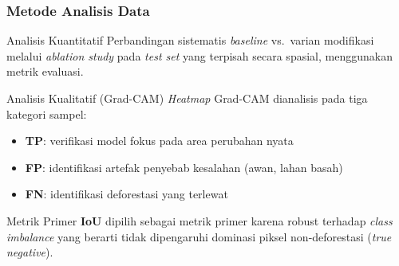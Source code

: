 \documentclass{beamer}
\begin{document}
	\begin{frame}
		\frametitle{Metode Analisis Data}
		
		\begin{block}{Analisis Kuantitatif}
			\small
			Perbandingan sistematis \textit{baseline} vs.\ varian modifikasi 
			melalui \textit{ablation study} pada \textit{test set} yang 
			terpisah secara spasial, menggunakan metrik evaluasi.
		\end{block}
		
		\begin{block}{Analisis Kualitatif (Grad-CAM)}
			\small
			\textit{Heatmap} Grad-CAM dianalisis pada tiga kategori sampel:
			\begin{itemize}
				\item \textbf{TP}: verifikasi model fokus pada area perubahan nyata
				\item \textbf{FP}: identifikasi artefak penyebab kesalahan (awan, lahan basah)
				\item \textbf{FN}: identifikasi deforestasi yang terlewat
			\end{itemize}
		\end{block}
		
		
		\begin{alertblock}{Metrik Primer}
			\small
			\textbf{IoU} dipilih sebagai metrik primer karena robust terhadap 
			\textit{class imbalance} yang berarti tidak dipengaruhi dominasi piksel 
			non-deforestasi (\textit{true negative}).
		\end{alertblock}
		
	\end{frame}
\end{document}
